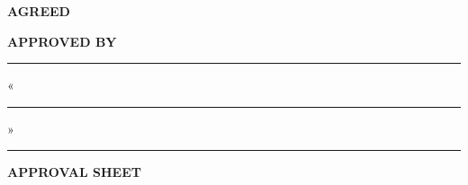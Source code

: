 \begin{center}
\begin{minipage}[t]{0.42\textwidth}
\textbf{AGREED}

\small
\scientificadvisorrole

\vspace{0.15cm}

\supervisorsignatureline{6cm}

\scientificadvisorname

\vspace{0.1cm}

\signdateblank
\ifhseHasCoSupervisor

\vspace{0.25cm}

\coscientificadvisorrole

\vspace{0.15cm}

\cosupervisorsignatureline{6cm}

\coscientificadvisorname

\vspace{0.1cm}

\signdateblank
\fi
\end{minipage}
\hspace{0.5cm}
\begin{minipage}[t]{0.42\textwidth}
\textbf{APPROVED BY}

\small
\academicsupervisorrole

\vspace{0.3cm}

\rule{6cm}{0.4pt}

\academicsupervisorname

\vspace{0.1cm}

«\rule{1cm}{0.4pt}» \rule{3cm}{0.4pt} \yearval
\end{minipage}
\end{center}

\hseFormGap{0.6cm}

\begin{center}
\textbf{\LARGE \projectname}

\hseFormGap{0.3cm}

\textbf{\docname}

\hseFormGap{0.1cm}

\textbf{APPROVAL SHEET}

\hseFormGap{0.1cm}

\textbf{\doccodelu}
\end{center}

